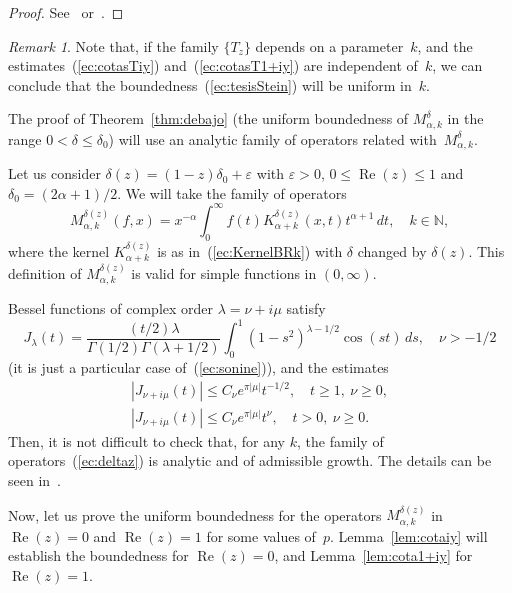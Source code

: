 \documentclass{amsart}
\theoremstyle{remark}
\newtheorem{rem}{Remark}
\newcommand{\N}{\mathbb{N}}
\renewcommand{\Re}{\operatorname{Re}}
\newcommand{\BRk}{M_{\alpha,k}^{\delta}}
\newcommand{\BRkd}[1]{M_{\alpha,k}^{\delta(#1)}} %
\newcommand{\KBRkd}[1]{K_{\alpha+k}^{\delta(#1)}} %
\begin{document}
\begin{proof}
See~\cite{St-Int} or~\cite[Ch.~V, \S~4]{StWe}.
\end{proof}

\begin{rem}
Note that, if the family $\{T_z\}$ depends on a parameter~$k$, and the
estimates~(\ref{ec:cotasTiy}) and~(\ref{ec:cotasT1+iy}) are independent
of~$k$, we can conclude that the boundedness~(\ref{ec:tesisStein}) will be
uniform in~$k$.
\end{rem}

The proof of Theorem~\ref{thm:debajo} (the uniform boundedness of $\BRk$
in the range $0<\delta\le\delta_0$) will use an analytic family of operators
related with~$\BRk$.

Let us consider $\delta(z) = (1-z)\delta_0 + \varepsilon$ with $\varepsilon>0$,
$0 \le \Re(z) \le 1$ and $\delta_0 = (2\alpha+1)/2$.
We will take the family of operators
\begin{equation}
\label{ec:deltaz}
    \BRkd{z}(f,x)
    = x^{-\alpha} \int_0^{\infty} f(t) \KBRkd{z}(x,t) t^{\alpha+1} \, dt,
    \quad k\in\N,
\end{equation}
where the kernel $\KBRkd{z}$ is as in~(\ref{ec:KernelBRk}) with $\delta$
changed by $\delta(z)$. This definition of $\BRkd{z}$ is valid for 
simple functions in $(0,\infty)$.

Bessel functions of complex order $\lambda=\nu+i\mu$ satisfy
\begin{equation*}
    J_\lambda(t) = \frac{(t/2)\lambda}{\Gamma(1/2)\Gamma(\lambda+1/2)}
      \int_0^1 (1-s^2)^{\lambda-1/2}\cos(st) \, ds, \quad \nu > -1/2
\end{equation*}
(it is just a particular case of~(\ref{ec:sonine})), and the estimates
\begin{gather}
    \label{ec:cota1/2}
    |J_{\nu+i\mu}(t)| \le C_\nu e^{\pi|\mu|} t^{-1/2},
    \quad t \ge 1,\ \nu \ge 0, 
    \\
    \label{ec:cotanu}
    |J_{\nu+i\mu}(t)| \le C_\nu e^{\pi|\mu|} t^{\nu},
    \quad t > 0,\ \nu \ge 0.
\end{gather}
Then, it is not difficult to check that, for any $k$, the family of
operators~(\ref{ec:deltaz}) is analytic and of admissible growth.
The details can be seen in~\cite[\S~3]{Well}.

Now, let us prove the uniform boundedness for the operators $\BRkd{z}$ in
$\Re(z)=0$ and $\Re(z)=1$ for some values of~$p$. 
Lemma~\ref{lem:cotaiy} will establish the boundedness for $\Re(z)=0$,
and Lemma~\ref{lem:cota1+iy} for $\Re(z)=1$.
\end{document}
